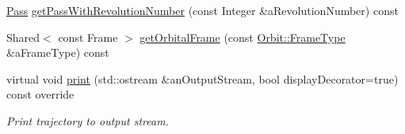 \begin{DoxyCompactItemize}
\item 
\hyperlink{classostk_1_1astro_1_1trajectory_1_1orbit_1_1_pass}{Pass} \hyperlink{classostk_1_1astro_1_1trajectory_1_1_orbit_adee37553d5e3a67ab23f749c9147dd5c}{get\+Pass\+With\+Revolution\+Number} (const Integer \&a\+Revolution\+Number) const
\item 
Shared$<$ const Frame $>$ \hyperlink{classostk_1_1astro_1_1trajectory_1_1_orbit_a2549ae1a3ce8be76f441cfa85e9ab5ee}{get\+Orbital\+Frame} (const \hyperlink{classostk_1_1astro_1_1trajectory_1_1_orbit_a1cc449ad56374471a8ab4300dde979e7}{Orbit\+::\+Frame\+Type} \&a\+Frame\+Type) const
\item 
virtual void \hyperlink{classostk_1_1astro_1_1trajectory_1_1_orbit_ae890e832785f84c3f03c1e103f952826}{print} (std\+::ostream \&an\+Output\+Stream, bool display\+Decorator=true) const override
\begin{DoxyCompactList}\small\item\em Print trajectory to output stream. \end{DoxyCompactList}\end{DoxyCompactItemize}
